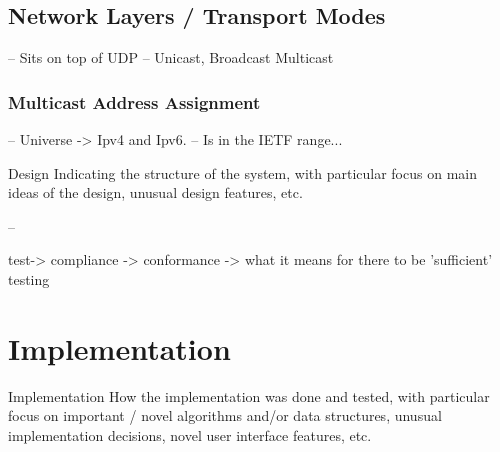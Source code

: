 \documentclass[11pt,a4paper]{report}
\begin{document}
\subsection{Network Layers / Transport Modes}
-- Sits on top of UDP
-- Unicast, Broadcast Multicast

\subsubsection{Multicast Address Assignment}
-- Universe -> Ipv4 and Ipv6. 
-- Is in the IETF range...


	Design
	Indicating the structure of the system, with particular
	focus on main ideas of the design, unusual design
	features, etc.

--
	
test-> compliance -> conformance -> what it means for there to be 'sufficient' testing
	
\section{Implementation}
Implementation
How the implementation was done and tested, with particular focus on important / novel algorithms and/or data structures, unusual implementation decisions, novel user interface features, etc.
	
\end{document}

